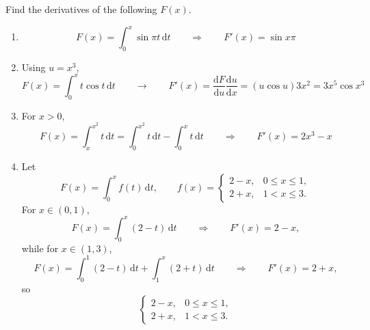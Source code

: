 \documentclass[letter-paper]{tufte-book}
\newenvironment{example}[1][Example]{\begin{trivlist}
\item[\hskip \labelsep {\bfseries #1}]}{\end{trivlist}}
\begin{document}
\begin{example}
  Find the derivatives of the following $F(x)$.
  \begin{enumerate}
    \item \begin{equation*}
      F(x)=\int_0^x \sin\pi t\, \mathrm{d}t\qquad\Rightarrow\qquad
      F'(x)=\sin x\pi
    \end{equation*}
    
    \item Using $u=x^3$,
    \begin{equation*}
      F(x)=\int_0^x t\cos t\, \mathrm{d}t\qquad\rightarrow\qquad
      F'(x)=\frac{\mathrm{d}F}{\mathrm{d}u}\frac{\mathrm{d}u}{\mathrm{d}x}
      =(u\cos u)3x^2 = 3x^5\cos x^3
    \end{equation*}
    
    \item For $x>0$,
    \begin{equation*}
      F(x)=\int_x^{x^2}t\, \mathrm{d}t = 
      \int_0^{x^2}t\, \mathrm{d}t-\int_0^x t\, \mathrm{d}t
      \qquad\Rightarrow\qquad
      F'(x)=2x^3-x
    \end{equation*}
    
    \item Let
    \begin{equation*}
      F(x)=\int_0^x f(t)\, \mathrm{d}t,\qquad f(x)=
      \begin{cases} 2-x, & 0\leq x\leq 1,\\ 2+x, & 1<x\leq 3.\end{cases}
    \end{equation*}
    For $x\in(0,1)$,
    \begin{equation*}
      F(x)=\int_0^x (2-t)\, \mathrm{d}t\qquad\Rightarrow\qquad F'(x)=2-x,
    \end{equation*}
    while for $x\in(1,3)$,
    \begin{equation*}
      F(x)=\int_0^1 (2-t)\, \mathrm{d}t + \int_1^x (2+t)\, \mathrm{d}t
      \qquad\Rightarrow\qquad F'(x)=2+x,
    \end{equation*}
    so
    \begin{equation*}
      \begin{cases} 2-x, & 0\leq x\leq 1,\\ 2+x, & 1<x\leq 3.\end{cases}
    \end{equation*}
  \end{enumerate}
\end{example}
\end{document}
